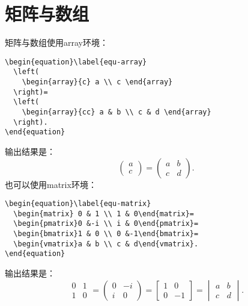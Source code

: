 \section{矩阵与数组}\label{section4-5}
矩阵与数组使用array环境：
\begin{verbatim}
\begin{equation}\label{equ-array}
  \left(
    \begin{array}{c} a \\ c \end{array}
  \right)=
  \left(
    \begin{array}{cc} a & b \\ c & d \end{array}
  \right).
\end{equation}
\end{verbatim}
输出结果是：
\begin{equation}\label{equ-array}
  \left(
  \begin{array}{c} a \\ c \end{array}
  \right)=
  \left(
  \begin{array}{cc} a & b \\ c & d \end{array}
  \right).
\end{equation}
也可以使用matrix环境：
\begin{verbatim}
\begin{equation}\label{equ-matrix}
  \begin{matrix} 0 & 1 \\ 1 & 0\end{matrix}=
  \begin{pmatrix}0 &-i \\ i & 0\end{pmatrix}=
  \begin{bmatrix}1 & 0 \\ 0 &-1\end{bmatrix}=
  \begin{vmatrix}a & b \\ c & d\end{vmatrix}.
\end{equation}
\end{verbatim}
输出结果是：
\begin{equation}\label{equ-matrix}
  \begin{matrix} 0 & 1 \\ 1 & 0\end{matrix}=
  \begin{pmatrix}0 &-i \\ i & 0\end{pmatrix}=
  \begin{bmatrix}1 & 0 \\ 0 &-1\end{bmatrix}=
  \begin{vmatrix}a & b \\ c & d\end{vmatrix}.
\end{equation}

